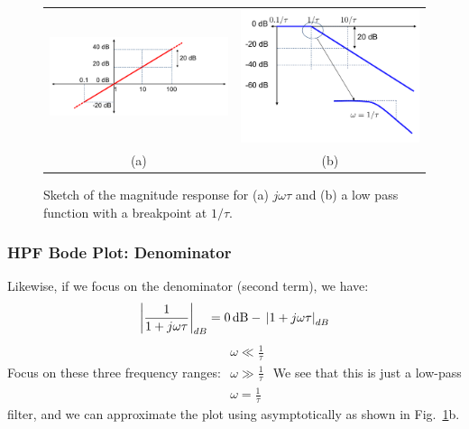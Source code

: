 \begin{figure}[tb]
\begin{center}
\begin{tabular}{cc}
\includegraphics[width=.6\columnwidth]{mod1_3_9_bode1} &
\includegraphics[width=.4\columnwidth]{mod1_3_10_bode2} \\
(a) & (b) \\
\end{tabular}
\end{center}
\caption{Sketch of the magnitude response for (a) $j\omega \tau$ and (b) a low pass function with a breakpoint at $1/\tau$.} \label{fig:hpfnumden}
\end{figure}




\subsubsection{HPF Bode Plot: Denominator}

Likewise, if we focus on the denominator (second term), we have:
\begin{equation} 
{\left| {\frac{1}{{1 + j\omega \tau }}} \right|_{dB}} = 0\,{\rm{dB}} - \,{\left| {1 + j\omega \tau } \right|_{dB}}
\end{equation}
Focus on these three frequency ranges:
$\begin{array}{l}
\omega  \ll \frac{1}{\tau }\\
\omega  \gg \frac{1}{\tau }\\
\omega  = \frac{1}{\tau }
\end{array}$
We see that this is just a low-pass filter, and we can approximate the plot using asymptotically as shown in Fig.~\ref{fig:hpfnumden}b. 
	 

